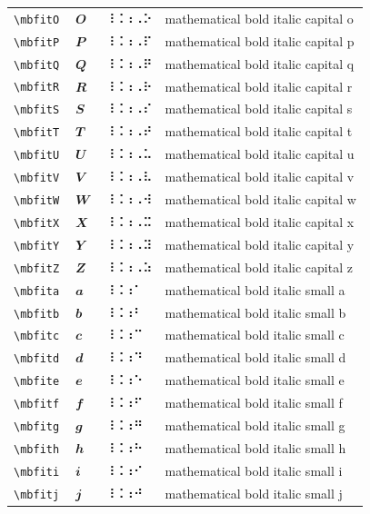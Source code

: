 \documentclass[oneside]{article}
\begin{document}
\begin{longtable}{llll}
\verb|\mbfitO| & $\mbfitO$ &  ⠸⠨⠰⠠⠕  & {mathematical bold italic capital o} \\[2ex]
\verb|\mbfitP| & $\mbfitP$ &  ⠸⠨⠰⠠⠏  & {mathematical bold italic capital p} \\[2ex]
\verb|\mbfitQ| & $\mbfitQ$ &  ⠸⠨⠰⠠⠟  & {mathematical bold italic capital q} \\[2ex]
\verb|\mbfitR| & $\mbfitR$ &  ⠸⠨⠰⠠⠗  & {mathematical bold italic capital r} \\[2ex]
\verb|\mbfitS| & $\mbfitS$ &  ⠸⠨⠰⠠⠎  & {mathematical bold italic capital s} \\[2ex]
\verb|\mbfitT| & $\mbfitT$ &  ⠸⠨⠰⠠⠞  & {mathematical bold italic capital t} \\[2ex]
\verb|\mbfitU| & $\mbfitU$ &  ⠸⠨⠰⠠⠥  & {mathematical bold italic capital u} \\[2ex]
\verb|\mbfitV| & $\mbfitV$ &  ⠸⠨⠰⠠⠧  & {mathematical bold italic capital v} \\[2ex]
\verb|\mbfitW| & $\mbfitW$ &  ⠸⠨⠰⠠⠺  & {mathematical bold italic capital w} \\[2ex]
\verb|\mbfitX| & $\mbfitX$ &  ⠸⠨⠰⠠⠭  & {mathematical bold italic capital x} \\[2ex]
\verb|\mbfitY| & $\mbfitY$ &  ⠸⠨⠰⠠⠽  & {mathematical bold italic capital y} \\[2ex]
\verb|\mbfitZ| & $\mbfitZ$ &  ⠸⠨⠰⠠⠵  & {mathematical bold italic capital z} \\[2ex]
\verb|\mbfita| & $\mbfita$ &  ⠸⠨⠰⠁  & {mathematical bold italic small a} \\[2ex]
\verb|\mbfitb| & $\mbfitb$ &  ⠸⠨⠰⠃  & {mathematical bold italic small b} \\[2ex]
\verb|\mbfitc| & $\mbfitc$ &  ⠸⠨⠰⠉  & {mathematical bold italic small c} \\[2ex]
\verb|\mbfitd| & $\mbfitd$ &  ⠸⠨⠰⠙  & {mathematical bold italic small d} \\[2ex]
\verb|\mbfite| & $\mbfite$ &  ⠸⠨⠰⠑  & {mathematical bold italic small e} \\[2ex]
\verb|\mbfitf| & $\mbfitf$ &  ⠸⠨⠰⠋  & {mathematical bold italic small f} \\[2ex]
\verb|\mbfitg| & $\mbfitg$ &  ⠸⠨⠰⠛  & {mathematical bold italic small g} \\[2ex]
\verb|\mbfith| & $\mbfith$ &  ⠸⠨⠰⠓  & {mathematical bold italic small h} \\[2ex]
\verb|\mbfiti| & $\mbfiti$ &  ⠸⠨⠰⠊  & {mathematical bold italic small i} \\[2ex]
\verb|\mbfitj| & $\mbfitj$ &  ⠸⠨⠰⠚  & {mathematical bold italic small j} \\[2ex]

\end{longtable}
\end{document}
